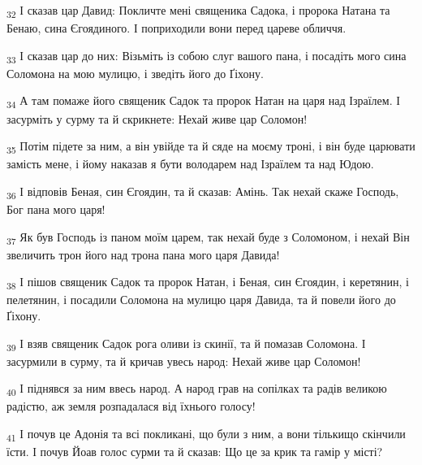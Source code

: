 \begin{tcolorbox}
\textsubscript{32} І сказав цар Давид: Покличте мені священика Садока, і пророка Натана та Бенаю, сина Єгоядиного. І поприходили вони перед цареве обличчя.
\end{tcolorbox}
\begin{tcolorbox}
\textsubscript{33} І сказав цар до них: Візьміть із собою слуг вашого пана, і посадіть мого сина Соломона на мою мулицю, і зведіть його до Ґіхону.
\end{tcolorbox}
\begin{tcolorbox}
\textsubscript{34} А там помаже його священик Садок та пророк Натан на царя над Ізраїлем. І засурміть у сурму та й скрикнете: Нехай живе цар Соломон!
\end{tcolorbox}
\begin{tcolorbox}
\textsubscript{35} Потім підете за ним, а він увійде та й сяде на моєму троні, і він буде царювати замість мене, і йому наказав я бути володарем над Ізраїлем та над Юдою.
\end{tcolorbox}
\begin{tcolorbox}
\textsubscript{36} І відповів Беная, син Єгоядин, та й сказав: Амінь. Так нехай скаже Господь, Бог пана мого царя!
\end{tcolorbox}
\begin{tcolorbox}
\textsubscript{37} Як був Господь із паном моїм царем, так нехай буде з Соломоном, і нехай Він звеличить трон його над трона пана мого царя Давида!
\end{tcolorbox}
\begin{tcolorbox}
\textsubscript{38} І пішов священик Садок та пророк Натан, і Беная, син Єгоядин, і керетянин, і пелетянин, і посадили Соломона на мулицю царя Давида, та й повели його до Ґіхону.
\end{tcolorbox}
\begin{tcolorbox}
\textsubscript{39} І взяв священик Садок рога оливи із скинії, та й помазав Соломона. І засурмили в сурму, та й кричав увесь народ: Нехай живе цар Соломон!
\end{tcolorbox}
\begin{tcolorbox}
\textsubscript{40} І піднявся за ним ввесь народ. А народ грав на сопілках та радів великою радістю, аж земля розпадалася від їхнього голосу!
\end{tcolorbox}
\begin{tcolorbox}
\textsubscript{41} І почув це Адонія та всі покликані, що були з ним, а вони тількищо скінчили їсти. І почув Йоав голос сурми та й сказав: Що це за крик та гамір у місті?
\end{tcolorbox}
